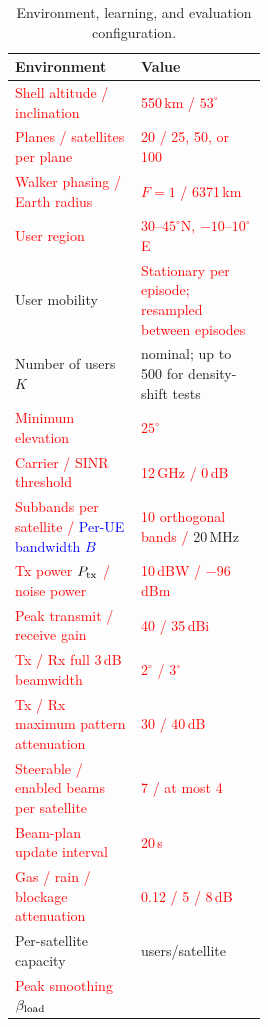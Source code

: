\documentclass[10pt,letterpaper,journal]{IEEEtran}
\newcommand{\revnew}[1]{\textcolor{red}{#1}}
\begin{document}
\begin{table}[t]
\centering
\caption{Environment, learning, and evaluation configuration.}
\label{tab:sim_params}\label{tab:learning_config}
\footnotesize
\renewcommand{\arraystretch}{1.06}
\setlength{\tabcolsep}{3pt}
\begin{minipage}[t]{0.49\textwidth}
\vspace{0pt}
\begin{tabularx}{\linewidth}{@{}>{\raggedright\arraybackslash}p{0.50\linewidth}>{\raggedright\arraybackslash}X@{}}
\toprule
Environment & Value \\
\midrule
\revnew{Shell altitude / inclination} & \revnew{550\,km / $53^\circ$} \\
\revnew{Planes / satellites per plane} & \revnew{20 / 25, 50, or 100} \\
\revnew{Walker phasing / Earth radius} & \revnew{$F=1$ / 6371\,km} \\
\revnew{User region} & \revnew{$30$--$45^\circ$N, $-10$--$10^\circ$E} \\
User mobility & \revnew{Stationary per episode; resampled between episodes} \\
Number of users $K$ & 100 nominal; up to 500 for density-shift tests \\
\revnew{Minimum elevation} & \revnew{$25^\circ$} \\
\revnew{Carrier / SINR threshold} & \revnew{12\,GHz / 0\,dB} \\
\revnew{Subbands per satellite / }\textcolor{blue}{Per-UE bandwidth $B$} & \revnew{10 orthogonal bands / }20\,MHz \\
\revnew{Tx power $P_{\rm tx}$ / noise power} & \revnew{10\,dBW / $-96$\,dBm} \\
\revnew{Peak transmit / receive gain} & \revnew{40 / 35\,dBi} \\
\revnew{Tx / Rx full 3\,dB beamwidth} & \revnew{$2^\circ$ / $3^\circ$} \\
\revnew{Tx / Rx maximum pattern attenuation} & \revnew{30 / 40\,dB} \\
\revnew{Steerable / enabled beams per satellite} & \revnew{7 / at most 4} \\
\revnew{Beam-plan update interval} & \revnew{20\,s} \\
\revnew{Gas / rain / blockage attenuation} & \revnew{0.12 / 5 / 8\,dB} \\
Per-satellite capacity & 10 users/satellite \\
\revnew{Peak smoothing $\beta_{\rm load}$} & 0.8 \\

\end{tabularx}
\end{minipage}
\end{table}
\end{document}
